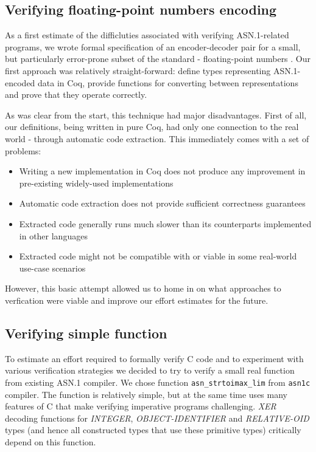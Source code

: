 \documentclass[acmsmall,nonacm]{acmart}
\begin{document}
\subsection{Verifying floating-point numbers encoding}

As a first estimate of the difficluties associated with
verifying ASN.1-related programs, we wrote
formal specification of an encoder-decoder pair for a small, but
particularly error-prone subset of the standard - floating-point numbers \cite{ASN1Intro}.
Our first approach was relatively straight-forward: define types
representing ASN.1-encoded data in Coq, provide functions for converting
between representations and prove that they operate correctly.

As was clear from the start, this technique had major disadvantages.
First of all, our definitions, being written in pure Coq, had only one
connection to the real world - through automatic code extraction.
This immediately comes with a set of problems:

\begin{itemize}
\item Writing a new implementation in Coq does not produce any improvement in pre-existing widely-used implementations
\item Automatic code extraction does not provide sufficient correctness guarantees
\item Extracted code generally runs much slower than its counterparts implemented in other languages
\item Extracted code might not be compatible with or viable in some real-world use-case scenarios
\end{itemize}

However, this basic attempt allowed us to home in on what approaches
to verfication were viable and improve our effort estimates for the future. %

\subsection{Verifying simple function}

To estimate an effort required to formally verify C code and to
experiment with various verification strategies we decided to try to
verify a small real function from existing ASN.1 compiler. We chose
function \texttt{asn\_strtoimax\_lim} from \texttt{asn1c} compiler.
The function is relatively simple, but at the same time uses many
features of C that make verifying imperative programs
challenging. \emph{XER} decoding functions for \emph{INTEGER},
\emph{OBJECT-IDENTIFIER} and \emph{RELATIVE-OID} types (and hence all
constructed types that use these primitive types) critically depend on
this function.
\end{document}
